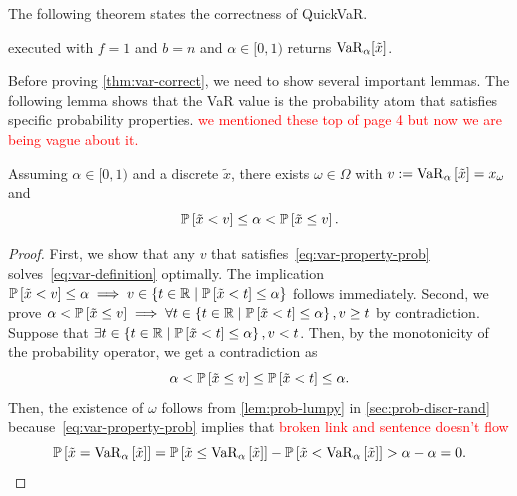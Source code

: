 \documentclass[10pt]{article} %
\newcommand{\gersi}[1]{\textcolor{red}{#1}}
\begin{document}
The following theorem states the correctness of QuickVaR.
\begin{theorem} \label{thm:var-correct}
 executed with $f = 1$ and $b = n$ and $\alpha\in [0,1)$ returns $\varo_{\alpha}[ \tilde{x} ]$.
\end{theorem}

Before proving \cref{thm:var-correct}, we need to show several important lemmas. The following lemma shows that the VaR value is the probability atom that satisfies specific probability properties. \gersi{we mentioned these top of page 4 but now we are being vague about it.}
\begin{lemma}\label{thm:quantile-in-finite-omega}
Assuming $\alpha\in [0,1)$ and a discrete $\tilde{x}$, there exists $\omega\in\Omega$ with $v := \var{\alpha }{\tilde{x}} = x_{\omega}$ and
\begin{equation} \label{eq:var-property-prob}
  \P{\tilde{x} < v} \le \alpha < \P{\tilde{x} \le v}. 
\end{equation}
\end{lemma}
\begin{proof}
First, we show that any $v$ that satisfies~\eqref{eq:var-property-prob} solves~\eqref{eq:var-definition} optimally. The implication $\P{\tilde{x} < v} \le \alpha \implies v \in \left\{ t \in \Real \mid  \P{ \tilde{x} < t } \le \alpha \right\}$ follows immediately. Second, we prove $\alpha < \P{ \tilde{x} \le v } \implies \forall t \in \left\{ t \in \Real \mid  \P{ \tilde{x} < t } \le \alpha \right\}, v \ge t$ by contradiction. Suppose that $\exists t \in \left\{ t \in \Real \mid  \P{ \tilde{x} < t } \le \alpha \right\}, v < t$. Then, by the monotonicity of the probability operator, we get a contradiction as
 \[
   \alpha
   < \P {  \tilde{x} \le v  }
   \le \P {  \tilde{x} < t  }
   \le \alpha.
 \]
 Then, the existence of $\omega$ follows from \cref{lem:prob-lumpy} in \cref{sec:prob-discr-rand} because~\eqref{eq:var-property-prob} implies that \gersi{broken link and sentence doesn't flow}
  \[
    \P{\tilde{x} =
      \var{\alpha }{\tilde{x}}} = \P{\tilde{x} \le \var{\alpha }{\tilde{x}}}  - \P{\tilde{x} < \var{\alpha }{\tilde{x}}} > \alpha - \alpha = 0.
  \]
\end{proof}
\end{document}
